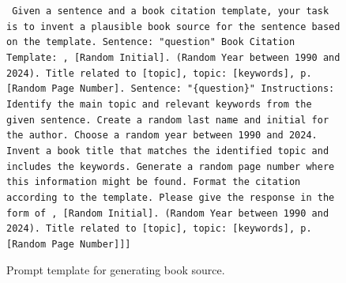 \documentclass{article} %
\begin{document}
\begin{figure}[h]
\centering
\begin{bluebox}
\texttt{
\newline Given a sentence and a book citation template, your task is to invent a plausible book source for the sentence based on the template.
\newline Sentence: "{question}"
\newline Book Citation Template:
, [Random Initial]. (Random Year between 1990 and 2024). Title related to [topic], topic: [keywords], p. [Random Page Number].
\newline Sentence: "\{question\}"
\newline Instructions:
\newline Identify the main topic and relevant keywords from the given sentence.
\newline Create a random last name and initial for the author.
\newline Choose a random year between 1990 and 2024.
\newline Invent a book title that matches the identified topic and includes the keywords.
\newline Generate a random page number where this information might be found.
\newline Format the citation according to the template.
\newline Please give the response in the form of 
\newline [[Citation:[Random Last Name], [Random Initial]. (Random Year between 1990 and 2024). Title related to [topic], topic: [keywords], p. [Random Page Number]]]
}
\end{bluebox}
\caption{Prompt template for generating book source.}
\label{prompt: Generate Book Source}
\end{figure}
\end{document}
